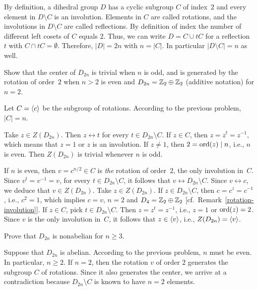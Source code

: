 \begin{solution} By definition, a dihedral group $D$ has a cyclic subgroup $C$ of index~$2$ and every element in $D\setminus C$ is an involution. Elements in $C$ are called rotations, and the involutions in $D\setminus C$ are called reflections. By definition of index the number of different left cosets of $C$ equals $2$. Thus, we can write $D=C\cup tC$ for a reflection $t$ with $C\cap tC=\emptyset$. Therefore, $|D|=2n$ with $n=|C|$. In particular $|D\setminus C|=n$ as well.  \end{solution} 

\begin{probl}
    Show that the center of\/ $D_{2n}$ is trivial when\/ $n$ is odd, and is generated by the rotation of order~$2$ when\/ $n>2$ is even and $D_{2n}=\mathbb{Z}_2\oplus\mathbb{Z}_2$ (additive notation) for\/ $n=2$.
\end{probl}

\begin{solution} Let $C=\langle c\rangle$ be the subgroup of rotations. According to the previous problem, $|C|=n$.

Take $z\in Z(D_{2n})$. Then $z\leftrightarrow t$ for every $t\in D_{2n}\setminus C$. If $z\in C$, then $z=z^t=z^{-1}$, which means that $z=1$ or $z$ is an involution. If $z\ne1$, then $2={\rm ord}(z)\mid n$, i.e., $n$ is even. Then $Z(D_{2n})$ is trivial whenever $n$ is odd.

If $n$ is even, then $v=c^{n/2}\in C$ is \textsl{the\/} rotation of order~$2$, the only involution in~$C$. Since $v^t=v^{-1}=v$, for every $t\in D_{2n}\setminus C$, it follows that $v\leftrightarrow D_{2n}\setminus C$. Since $v\leftrightarrow c$, we deduce that $v\in Z(D_{2n})$. Take $z\in Z(D_{2n})$. If $z\in D_{2n}\setminus C$, then $c=c^z=c^{-1}$, i.e., $c^2=1$, which implies $c=v$, $n=2$ and $D_4=\mathbb{Z}_2\oplus\mathbb{Z}_2$ [cf.~Remark~\ref{rotation-involution}]. If $z\in C$, pick $t\in D_{2n}\setminus C$. Then $z=z^t=z^{-1}$, i.e., $z=1$ or ${\rm ord}(z)=2$. Since $v$ is the only involution in~$C$, it follows that $z\in\langle v\rangle$, i.e., $Z(D_{2n})=\langle v\rangle$.  \end{solution}

\begin{probl}
    Prove that $D_{2n}$ is nonabelian for $n \geq 3$.    
\end{probl}

\begin{solution} Suppose that $D_{2n}$ is abelian. According to the previous problem, $n$ must be even. In particular, $n\ge2$. If $n=2$, then the rotation $v$ of order $2$ generates the subgroup $C$ of rotations. Since it also generates the center, we arrive at a contradiction because $D_{2n}\setminus C$ is known to have $n=2$ elements.  \end{solution}

